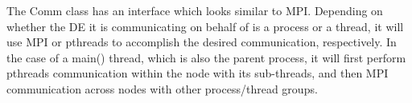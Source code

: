
The Comm class has an interface which looks similar to MPI.  Depending on
whether the DE it is communicating on behalf of is a process or a thread, it
will use MPI or pthreads to accomplish the desired communication, respectively.
In the case of a main() thread, which is also the parent process, it will
first perform pthreads communication within the node with its sub-threads,
and then MPI communication across nodes with other process/thread groups.
~
